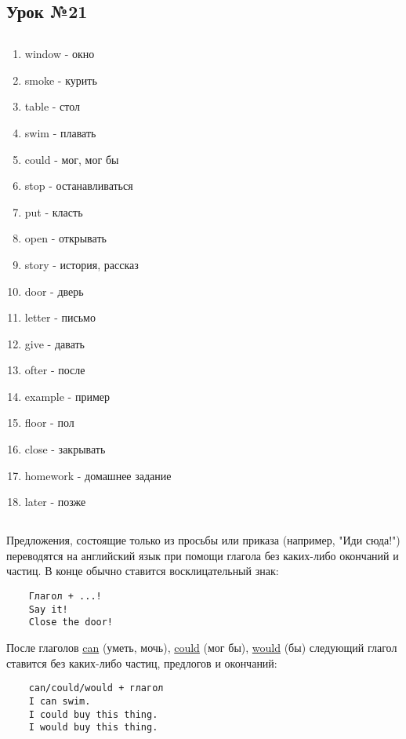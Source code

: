\subsection{Урок №21}

\subsection*{}
\begin{multicols}{2}
    \begin{enumerate}\setlength{\itemsep}{0pt}
        \item window - окно
        \item smoke - курить
        \item table - стол
        \item swim - плавать
        \item could - мог, мог бы
        \item stop - останавливаться
        \item put - класть
        \item open - открывать
        \item story - история, рассказ
        \item door - дверь
        \item letter - письмо
        \item give - давать
        \item ofter - после
        \item example - пример
        \item floor - пол
        \item close - закрывать
        \item homework - домашнее задание
        \item later - позже
    \end{enumerate}
\end{multicols}

\subsection*{}
Предложения, состоящие только из просьбы или приказа (например, "Иди сюда!") переводятся на английский язык
при помощи глагола без каких-либо окончаний и частиц. В конце обычно ставится восклицательный знак:
\begin{verbatim}
    Глагол + ...!
    Say it!
    Close the door!
\end{verbatim}

После глаголов \underline{can} (уметь, мочь), \underline{could} (мог бы), \underline{would} (бы) следующий
глагол ставится без каких-либо частиц, предлогов и окончаний:
\begin{verbatim}
    can/could/would + глагол
    I can swim.
    I could buy this thing.
    I would buy this thing.
\end{verbatim}

